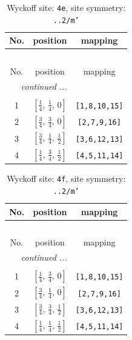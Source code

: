 \documentclass[fleqn,8pt]{jsarticle}
\begin{document}
\renewcommand{\arraystretch}{1.2}
\begin{longtable}{ccc}
\caption{Wyckoff site: {\tt 4e}, site symmetry: {\tt ..2/m'}}
 \\
 \hline \hline
No. & position & mapping \\ \hline \endfirsthead

\multicolumn{2}{l}{\tablename\ \thetable{}} \\
 \hline \hline
No. & position & mapping \\ \hline \endhead

 \hline \hline
\multicolumn{2}{r}{\footnotesize\it continued ...} \\ \endfoot

 \hline \hline
\multicolumn{2}{r}{} \\ \endlastfoot

1 & $\left[ \frac{1}{4},\, \frac{1}{4},\, 0 \right]$ & {\tt [1,8,10,15]} \\ \hline
2 & $\left[ \frac{3}{4},\, \frac{3}{4},\, 0 \right]$ & {\tt [2,7,9,16]} \\ \hline
3 & $\left[ \frac{3}{4},\, \frac{1}{4},\, \frac{1}{2} \right]$ & {\tt [3,6,12,13]} \\ \hline
4 & $\left[ \frac{1}{4},\, \frac{3}{4},\, \frac{1}{2} \right]$ & {\tt [4,5,11,14]} \\
\end{longtable}
\renewcommand{\arraystretch}{1.2}
\begin{longtable}{ccc}
\caption{Wyckoff site: {\tt 4f}, site symmetry: {\tt ..2/m'}}
 \\
 \hline \hline
No. & position & mapping \\ \hline \endfirsthead

\multicolumn{2}{l}{\tablename\ \thetable{}} \\
 \hline \hline
No. & position & mapping \\ \hline \endhead

 \hline \hline
\multicolumn{2}{r}{\footnotesize\it continued ...} \\ \endfoot

 \hline \hline
\multicolumn{2}{r}{} \\ \endlastfoot

1 & $\left[ \frac{1}{4},\, \frac{3}{4},\, 0 \right]$ & {\tt [1,8,10,15]} \\ \hline
2 & $\left[ \frac{3}{4},\, \frac{1}{4},\, 0 \right]$ & {\tt [2,7,9,16]} \\ \hline
3 & $\left[ \frac{3}{4},\, \frac{3}{4},\, \frac{1}{2} \right]$ & {\tt [3,6,12,13]} \\ \hline
4 & $\left[ \frac{1}{4},\, \frac{1}{4},\, \frac{1}{2} \right]$ & {\tt [4,5,11,14]} \\
\end{longtable}
\end{document}
